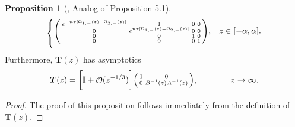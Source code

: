 \documentclass[usenames,dvipsnames]{article}
\theoremstyle{definition}
\newtheorem{prop}{Proposition}[section]
\DeclareMathOperator{\OO}{\mathcal{O}}
\numberwithin{equation}{section}
\numberwithin{figure}{section}
\begin{document}
\begin{prop}[\cite{DHL1}, Analog of Proposition 5.1]
\begin{equation}
\begin{cases}
                        \vspace{2mm}
                        \begin{psmallmatrix}
                            e^{-n\tau[\Omega_{1,-}(z)-\Omega_{2,-}(z)]} & 1 & 0 & 0 \\
                            0 & e^{n\tau[\Omega_{1,-}(z)-\Omega_{2,-}(z)]} & 0 & 0\\
                            0 & 0 & 1 & 0 \\
                            0 & 0 & 0 & 1
                        \end{psmallmatrix},
                        & z\in [-\alpha,\alpha].
                \end{cases}
            \end{equation}
        Furthermore, $\boldsymbol{T}(z)$ has asymptotics
\begin{equation}\label{T-asymptotics}
           \boldsymbol{T}(z) = 
           \bigg[\mathbb{I} + \OO (z^{-1/3})\bigg]
            \begin{psmallmatrix}
                1 & 0\\
                0 & B^{-1}(z) A^{-1}(z) 
            \end{psmallmatrix}, \qquad\qquad z\to \infty.
\end{equation}
    \end{prop}
\begin{proof}
    The proof of this proposition follows immediately from the definition of $\boldsymbol{T}(z)$.
\end{proof}
\end{document}
